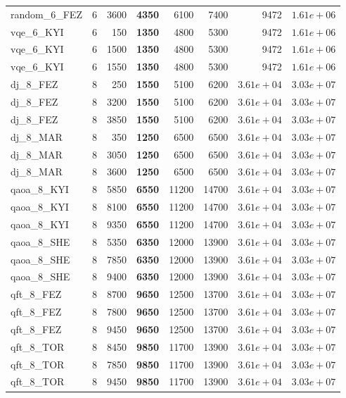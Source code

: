 \begin{table}[ht!]
\begin{tabular}{l c r r r r r r}
random\_6\_FEZ & 6 & 3600 & \textbf{4350} & 6100 & 7400 & 9472 & $1.61e+06$ \\
vqe\_6\_KYI & 6 & 150 & \textbf{1350} & 4800 & 5300 & 9472 & $1.61e+06$ \\
vqe\_6\_KYI & 6 & 1500 & \textbf{1350} & 4800 & 5300 & 9472 & $1.61e+06$ \\
vqe\_6\_KYI & 6 & 1550 & \textbf{1350} & 4800 & 5300 & 9472 & $1.61e+06$ \\
dj\_8\_FEZ & 8 & 250 & \textbf{1550} & 5100 & 6200 & $3.61e+04$ & $3.03e+07$ \\
dj\_8\_FEZ & 8 & 3200 & \textbf{1550} & 5100 & 6200 & $3.61e+04$ & $3.03e+07$ \\
dj\_8\_FEZ & 8 & 3850 & \textbf{1550} & 5100 & 6200 & $3.61e+04$ & $3.03e+07$ \\
dj\_8\_MAR & 8 & 350 & \textbf{1250} & 6500 & 6500 & $3.61e+04$ & $3.03e+07$ \\
dj\_8\_MAR & 8 & 3050 & \textbf{1250} & 6500 & 6500 & $3.61e+04$ & $3.03e+07$ \\
dj\_8\_MAR & 8 & 3600 & \textbf{1250} & 6500 & 6500 & $3.61e+04$ & $3.03e+07$ \\
qaoa\_8\_KYI & 8 & 5850 & \textbf{6550} & 11200 & 14700 & $3.61e+04$ & $3.03e+07$ \\
qaoa\_8\_KYI & 8 & 8100 & \textbf{6550} & 11200 & 14700 & $3.61e+04$ & $3.03e+07$ \\
qaoa\_8\_KYI & 8 & 9350 & \textbf{6550} & 11200 & 14700 & $3.61e+04$ & $3.03e+07$ \\
qaoa\_8\_SHE & 8 & 5350 & \textbf{6350} & 12000 & 13900 & $3.61e+04$ & $3.03e+07$ \\
qaoa\_8\_SHE & 8 & 7850 & \textbf{6350} & 12000 & 13900 & $3.61e+04$ & $3.03e+07$ \\
qaoa\_8\_SHE & 8 & 9400 & \textbf{6350} & 12000 & 13900 & $3.61e+04$ & $3.03e+07$ \\
qft\_8\_FEZ & 8 & 8700 & \textbf{9650} & 12500 & 13700 & $3.61e+04$ & $3.03e+07$ \\
qft\_8\_FEZ & 8 & 7800 & \textbf{9650} & 12500 & 13700 & $3.61e+04$ & $3.03e+07$ \\
qft\_8\_FEZ & 8 & 9450 & \textbf{9650} & 12500 & 13700 & $3.61e+04$ & $3.03e+07$ \\
qft\_8\_TOR & 8 & 8450 & \textbf{9850} & 11700 & 13900 & $3.61e+04$ & $3.03e+07$ \\
qft\_8\_TOR & 8 & 7850 & \textbf{9850} & 11700 & 13900 & $3.61e+04$ & $3.03e+07$ \\
qft\_8\_TOR & 8 & 9450 & \textbf{9850} & 11700 & 13900 & $3.61e+04$ & $3.03e+07$ \\

\end{tabular}
\end{table}
